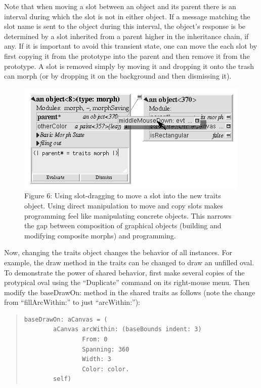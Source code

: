 \documentclass[letterpaper,10pt,english]{sphinxmanual}
\begin{document}
Note that when moving a slot between an object and its parent there is an interval during which the slot is not in either object. If a message matching the slot name is sent to the object during this interval, the object's response is be determined by a slot inherited from a parent higher in the inheritance chain, if any. If it is important to avoid this transient state, one can move the each slot by first copying it from the prototype into the parent and then remove it from the prototype. A slot is removed simply by moving it and dropping it onto the trash can morph (or by dropping it on the background and then dismissing it).
\begin{figure}[htbp]\begin{flushleft}
\capstart

\includegraphics{Figure6.png}
\caption{Figure 6: Using slot-dragging to move a slot into the new traits object. Using direct manipulation to move and copy slots makes programming feel like manipulating concrete objects. This narrows the gap between composition of graphical objects (building and modifying composite morphs) and programming.}\end{flushleft}\end{figure}

Now, changing the traits object changes the behavior of all instances. For example, the draw method in the traits can be changed to draw an unfilled oval. To demonstrate the power of shared behavior, first make several copies of the protypical oval using the ``Duplicate'' command on its right-mouse menu. Then modify the baseDrawOn: method in the shared traits as follows (note the change from ``fillArcWithin:'' to just ``arcWithin:''):
\begin{quote}

\begin{Verbatim}[commandchars=\\\{\}]
baseDrawOn: aCanvas = (
        aCanvas arcWithin: (baseBounds indent: 3)
                From: 0
                Spanning: 360
                Width: 3
                Color: color.
        self)
\end{Verbatim}
\end{quote}
\end{document}
